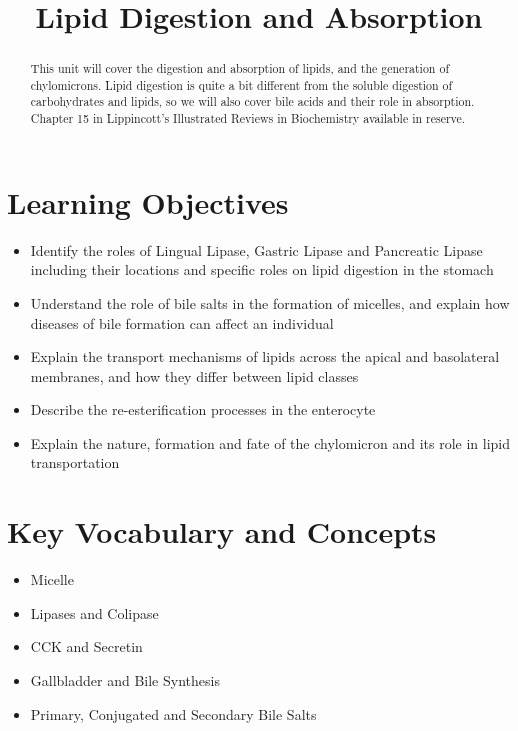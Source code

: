 \documentclass{tufte-handout}
\title{Lipid Digestion and Absorption}
\author{}
\date{}  %
\begin{document}
\maketitle%

\begin{abstract}
\noindent This unit will cover the digestion and absorption of lipids, and the generation of chylomicrons.  Lipid digestion is quite a bit different from the soluble digestion of carbohydrates and lipids, so we will also cover bile acids and their role in absorption.  Chapter 15 in Lippincott's Illustrated Reviews in Biochemistry available in reserve\cite{Ferrier2017}.
\end{abstract}

\tableofcontents

\pagebreak{}
\section{Learning Objectives}

\begin{itemize}
\item Identify the roles of Lingual Lipase, Gastric Lipase and Pancreatic Lipase including their locations and specific roles on lipid digestion in the stomach
\item Understand the role of bile salts in the formation of micelles, and explain how diseases of bile formation can affect an individual
\item Explain the transport mechanisms of lipids across the apical and basolateral membranes, and how they differ between lipid classes
\item Describe the re-esterification processes in the enterocyte
\item Explain the nature, formation and fate of the chylomicron and its role in lipid transportation
\end{itemize}

\section{Key Vocabulary and Concepts}
\begin{itemize}
	\item Micelle
	\item Lipases and Colipase
	\item CCK and Secretin 
	\item Gallbladder and Bile Synthesis
	\item Primary, Conjugated and Secondary Bile Salts
\end{itemize}
\end{document}
